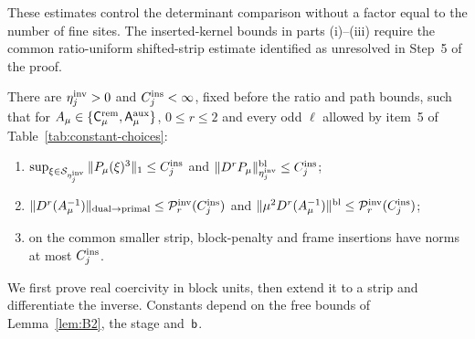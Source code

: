 These estimates control the determinant comparison without a factor equal to the number of fine sites. The inserted-kernel bounds in parts (i)--(iii) require the common ratio-uniform shifted-strip estimate identified as unresolved in Step~5 of the proof.
\begin{lemma}\label{lem:B7}
There are $\eta_j^{\rm inv}>0$ and $C_j^{\rm ins}<\infty$, fixed before the ratio and path bounds, such that for $A_\mu\in\{\mathsf C^{\rm rem}_\mu,\mathsf A^{\rm aux}_\mu\}$, $0\le r\le2$ and every odd $\ell$ allowed by item~5 of Table~\ref{tab:constant-choices}:
\begin{enumerate}[label=(\roman*)]
\item $\sup_{\xi\in\mathcal S_{\eta_j^{\rm inv}}}\|P_\mu(\xi)^3\|_1\le C_j^{\rm ins}$ and $\|D^rP_\mu\|_{\eta_j^{\rm inv}}^{\rm bl}\le C_j^{\rm ins}$;
\item $\|D^r(A_\mu^{-1})\|_{\rm dual\to primal}\le\mathcal P^{\rm inv}_r(C_j^{\rm ins})$ and $\|\mu^2D^r(A_\mu^{-1})\|^{\rm bl}\le\mathcal P^{\rm inv}_r(C_j^{\rm ins})$;
\item on the common smaller strip, block-penalty and frame insertions have norms at most $C_j^{\rm ins}$.
\end{enumerate}
\end{lemma}
We first prove real coercivity in block units, then extend it to a strip and differentiate the inverse. Constants depend on the free bounds of Lemma~\ref{lem:B2}, the stage and~$\mathsf{b}$.
